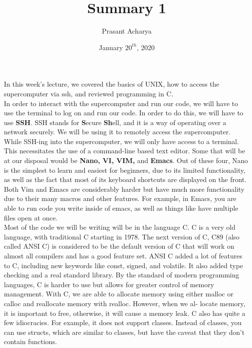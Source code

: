 \documentclass{article}
\title{Summary 1}
\author{Prasant Acharya}
\date{January $20^{th}$, 2020}
\begin{document}
\maketitle
In this week's lecture, we covered the basics of UNIX, how to access the supercomputer via ssh, and reviewed programming in C.
\\


 In order to interact with the supercomputer and run our code, we will have to use the terminal to log on and run our code. In order to do this, we will have to use \textbf{SSH}. SSH stands for \textbf{S}ecure \textbf{Sh}ell, and it is a way of operating over a network securely. We will be using it to remotely access the supercomputer. While SSH-ing into the supercomputer, we will only have access to a terminal. This necessitates the use of a command-line based text editor. Some that will be at our disposal would be \textbf{Nano, VI, VIM,} and \textbf{Emacs}. Out of these four, Nano is the simplest to learn and easiest for beginners, due to its limited functionality, as well as the fact that most of its keyboard shortcuts are displayed on the front. Both Vim and Emacs are considerably harder but have much more functionality due to their many macros and other features. For example, in Emacs, you are able to run code you write inside of emacs, as well as things like have multiple files open at once.
\\


 Most of the code we will be writing will be in the language C. C is a very old language, with traditional C starting in 1978. The next version of C, C89 (also called ANSI C) is considered to be the default version of C that will work on almost all compilers and has a good feature set. ANSI C added a lot of features to C, including new keywords like const, signed, and volatile. It also added type checking and a real standard library. By the standard of modern programming languages, C is harder to use but allows for greater control of memory management. With C, we are able to allocate memory using either malloc or calloc and reallocate memory with realloc. However, when we al- locate memory, it is important to free, otherwise, it will cause a memory leak. C also has quite a few idiocracies. For example, it does not support classes. Instead of classes, you can use structs, which are similar to classes, but have the caveat that they don't contain functions.
\end{document}
